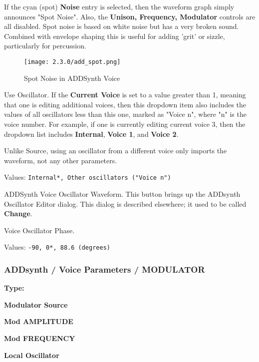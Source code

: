    If the cyan (spot) \textbf{Noise} entry is selected,
   then the waveform graph simply announces
   "Spot Noise".  Also, the \textbf{Unison, Frequency, Modulator} controls are
   all disabled.
   Spot noise is based on white noise but has a very broken sound. Combined
   with envelope shaping this is useful for adding 'grit' or sizzle,
   particularly for percussion.

\begin{figure}[H]
   \centering
   \texttt{[image: 2.3.0/add\_spot.png]}
   \caption{Spot Noise in ADDSynth Voice}
   \label{fig:voice_oscillator_spot_noise}
\end{figure}

   Use Oscillator.
   If the \textbf{Current Voice} is set to a value greater than 1, meaning
   that one is editing additional voices, then this dropdown item also
   includes the values of all oscillators less than this one, marked as
   "Voice n", where "n" is the voice number.
   For example, if one is currently editing current voice 3,
   then the dropdown list includes \textbf{Internal}, \textbf{Voice 1}, and
   \textbf{Voice 2}.

  Unlike Source, using an oscillator from a different voice
  only imports the waveform, not any other parameters.

   Values: \texttt{Internal*, Other oscillators ("Voice n")}

   ADDSynth Voice Oscillator Waveform.
   This button brings up the ADDsynth Oscillator Editor dialog.
   This dialog is described elsewhere; it used to be called
   \textbf{Change}.

   Voice Oscillator Phase.

   Values: \texttt{-90, 0*, 88.6 (degrees)}

\subsubsection{ADDsynth / Voice Parameters / MODULATOR}
\label{subsubsec:addsynth_voice_parameters_modulator}

   \begin{enumber}
      \item \textbf{Type:}
      \item \textbf{Modulator Source}
      \item \textbf{Mod AMPLITUDE}
      \item \textbf{Mod FREQUENCY}
      \item \textbf{Local Oscillator}
   \end{enumber}

